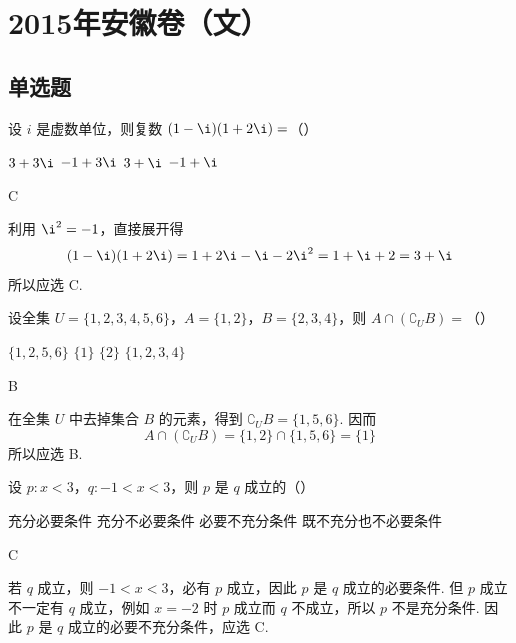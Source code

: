 \chapter{2015年安徽卷（文）}

\section{单选题}

\begin{problem}
设 \(i\) 是虚数单位，则复数 \( (1 - \i)(1 + 2\i) = \)（\quad）

\choices
    {\(3 + 3\i\)}
    {\(-1 + 3\i\)}
    {\(3 + \i\)}
    {\(-1 + \i\)}

\begin{answer}
C
\end{answer}

\begin{solution}
利用 \(\i^2=-1\)，直接展开得
\[
(1-\i)(1+2\i)=1+2\i-\i-2\i^2=1+\i+2=3+\i
\]
所以应选 C.
\end{solution}
\end{problem}

\begin{problem}
设全集 \(U = \{1, 2, 3, 4, 5, 6\}\)，\(A = \{1, 2\}\)，\(B = \{2, 3, 4\}\)，则 \(A \cap (\complement_U B) =\)（\quad）

\choices
    {\(\{1, 2, 5, 6\}\)}
    {\(\{1\}\)}
    {\(\{2\}\)}
    {\(\{1, 2, 3, 4\}\)}

\begin{answer}
B
\end{answer}

\begin{solution}
在全集 \(U\) 中去掉集合 \(B\) 的元素，得到 \(\complement_U B=\{1,5,6\}\). 因而
\[
A\cap(\complement_U B)=\{1,2\}\cap\{1,5,6\}=\{1\}
\]
所以应选 B.
\end{solution}
\end{problem}

\begin{problem}
设 \(p: x < 3\)，\(q: -1 < x < 3\)，则 \(p\) 是 \(q\) 成立的（\quad）

\choices
    {充分必要条件}
    {充分不必要条件}
    {必要不充分条件}
    {既不充分也不必要条件}

\begin{answer}
C
\end{answer}

\begin{solution}
若 \(q\) 成立，则 \(-1<x<3\)，必有 \(p\) 成立，因此 \(p\) 是 \(q\) 成立的必要条件. 但 \(p\) 成立不一定有 \(q\) 成立，例如 \(x=-2\) 时 \(p\) 成立而 \(q\) 不成立，所以 \(p\) 不是充分条件. 因此 \(p\) 是 \(q\) 成立的必要不充分条件，应选 C.
\end{solution}
\end{problem}

